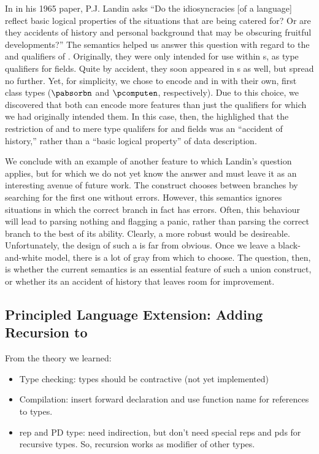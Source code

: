 In in his 1965 paper, P.J. Landin asks ``Do the idiosyncracies [of a
language] reflect basic logical properties of the situations that are
being catered for?  Or are they accidents of history and personal
background that may be obscuring fruitful developments?''  The
semantics helped us answer this question with regard to the \Pomit{}
and \Pcompute{} qualifiers of \pads{}.  Originally, they were only
intended for use within \Pstruct{}s, as type qualifiers for fields.
Quite by accident, they soon appeared in \Punion{}s as well, but
spread no further. Yet, for simplicity, we chose to encode \Pomit{}
and \Pcompute{} in \ddc{} with their own, first class types
($\pabsorbn$ and $\pcomputen$, respectively). Due to this choice, we
discovered that both can encode more \pads{} features than just the
qualifiers for which we had originally intended them. In this case,
then, the \ddc{} highlighed that the restriction of \Pomit{} and
\Pcompute{} to mere type qualifers for \Punion{} and \Pstruct{} fields
was an ``accident of history,'' rather than a ``basic logical
property'' of data description.

We conclude with an example of another feature to which Landin's
question applies, but for which we do not yet know the answer and must
leave it as an interesting avenue of future work. The \Punion{}
construct chooses between branches by searching for the first one
without errors. However, this semantics ignores situations in which
the correct branch in fact has errors. Often, this behaviour will lead
to parsing nothing and flagging a panic, rather than parsing the
correct branch to the best of its ability. Clearly, a more robust
\Punion{} would be desireable. Unfortunately, the design of such a
\Punion{} is far from obvious. Once we leave a black-and-white model,
there is a lot of gray from which to choose. The question, then, is
whether the current semantics is an essential feature of such a union
construct, or whether its an accident of history that leaves room for
improvement.

\subsection{Principled Language Extension: Adding Recursion to \pads{}}

From the theory we learned:
\begin{itemize}
\item Type checking: types should be contractive (not yet implemented)
\item Compilation: insert forward declaration and use function name for
  references to types.
\item rep and PD type: need indirection, but don't need special reps
  and pds for recursive types. So, recursion works as modifier of
  other types.
\end{itemize}

